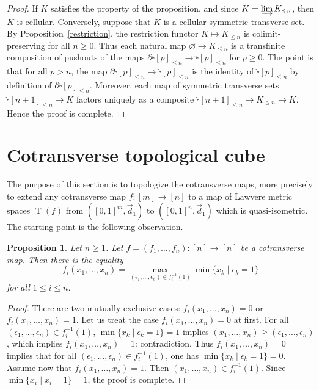 \documentclass[a4paper,12pt]{amsart}
\newcommand{\de}{\partial}
\renewcommand{\vec}{\overrightarrow}
\newtheorem{prop}[thm]{Proposition}
\newcommand{\bp}{\begin{prop}}
\newcommand{\ep}{\end{prop}}
\newcommand{\bpf}{\begin{proof}}
\newcommand{\epf}{\end{proof}}
\theoremstyle{definition}
\renewcommand{\leq}{\leqslant}
\renewcommand{\geq}{\geqslant}
\newcommand{\liminj}{\varinjlim}
\newcommand{\vd}{\vec{d}\!_1}
\DeclareMathOperator{\TT}{T}
\begin{document}
\bpf
If $K$ satisfies the property of the proposition, and since $K=\liminj K_{\leq n}$, then $K$ is cellular. Conversely, suppose that $K$ is a cellular symmetric transverse set. By Proposition~\ref{restriction}, the restriction functor $K\mapsto K_{\leq n}$ is colimit-preserving for all $n\geq 0$. Thus each natural map $\varnothing\to K_{\leq n}$ is a transfinite composition of pushouts of the maps $\de\widehat{\square}[p]_{\leq n}\to \widehat{\square}[p]_{\leq n}$ for $p\geq 0$. The point is that for all $p>n$, the map $\de\widehat{\square}[p]_{\leq n}\to \widehat{\square}[p]_{\leq n}$ is the identity of $\widehat{\square}[p]_{\leq n}$ by definition of $\de\widehat{\square}[p]_{\leq n}$. Moreover, each map of symmetric transverse sets $\widehat{\square}[n+1]_{\leq n} \to K$ factors uniquely as a composite $\widehat{\square}[n+1]_{\leq n} \to K_{\leq n}\to K$. Hence the proof is complete. 
\epf


\section{Cotransverse topological cube}
\label{topologize}


The purpose of this section is to topologize the cotransverse maps, more precisely to extend any cotransverse map $f:[m]\to [n]$ to a map of Lawvere metric spaces $\TT(f)$ from $([0,1]^m,\vd)$ to $([0,1]^n,\vd)$ which is quasi-isometric. The starting point is the following observation.

\bp \label{maxminxformula}
Let $n\geq 1$. Let $f=(f_1,\dots,f_n):[n]\to [n]$ be a cotransverse map. Then there is the equality 
\[
f_i(x_1,\dots,x_n) = \max_{(\epsilon_1,\dots,\epsilon_n)\in f_i^{-1}(1)} \min \{x_k\mid \epsilon_k=1\}
\]
for all $1\leq i\leq n$.
\ep

\bpf
There are two mutually exclusive cases: $f_i(x_1,\dots,x_n)=0$ or $f_i(x_1,\dots,x_n)=1$. Let us treat the case $f_i(x_1,\dots,x_n)=0$ at first. For all $(\epsilon_1,\dots,\epsilon_n)\in f_i^{-1}(1)$, $\min \{x_k\mid \epsilon_k=1\} = 1$ implies $(x_1,\dots,x_n)\geq (\epsilon_1,\dots,\epsilon_n)$, which implies $f_i(x_1,\dots,x_n)=1$: contradiction. Thus $f_i(x_1,\dots,x_n)=0$ implies that for all $(\epsilon_1,\dots,\epsilon_n)\in f_i^{-1}(1)$, one has $\min \{x_k\mid \epsilon_k=1\} = 0$. Assume now that $f_i(x_1,\dots,x_n)=1$. Then $(x_1,\dots,x_n)\in f_i^{-1}(1)$. Since $\min \{x_i\mid x_i=1\} = 1$, the proof is complete. 
\epf
\end{document}
